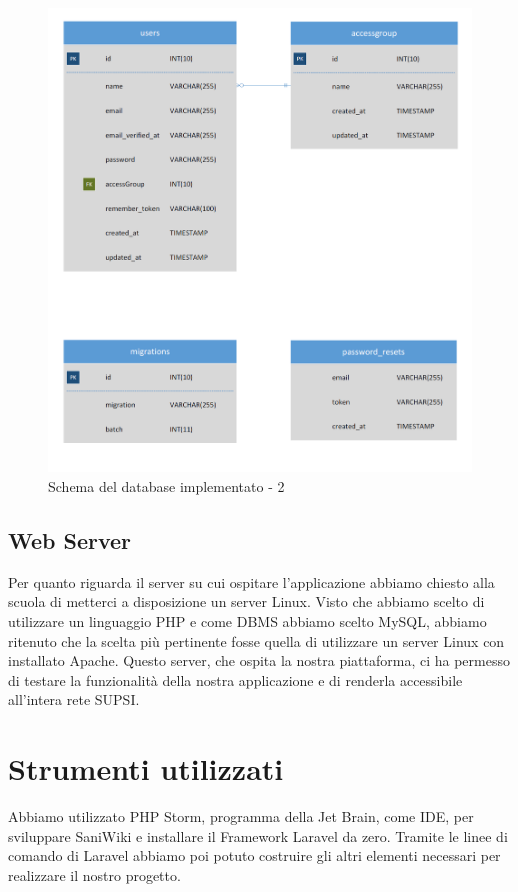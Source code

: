 \documentclass[twoside]{supsistudent}
\begin{document}
\begin{figure}[!h]
\centering
\includegraphics[scale=0.6]{schema_2.PNG}
\caption{Schema del database implementato - 2}
\end{figure}

\subsection{Web Server}
Per quanto riguarda il server su cui ospitare l'applicazione abbiamo chiesto alla scuola di metterci a disposizione un server Linux. Visto che abbiamo scelto di utilizzare un linguaggio PHP e come DBMS abbiamo scelto MySQL, abbiamo ritenuto che la scelta più pertinente fosse quella di utilizzare un server Linux con installato Apache. Questo server, che ospita la nostra piattaforma, ci ha permesso di testare la funzionalità della nostra applicazione e di renderla accessibile all’intera rete SUPSI.

\section{Strumenti utilizzati}
Abbiamo utilizzato PHP Storm, programma della Jet Brain, come IDE, per sviluppare SaniWiki e installare il Framework Laravel da zero. Tramite le linee di comando di Laravel abbiamo poi potuto costruire gli altri elementi necessari per realizzare il nostro progetto. 
\end{document}
